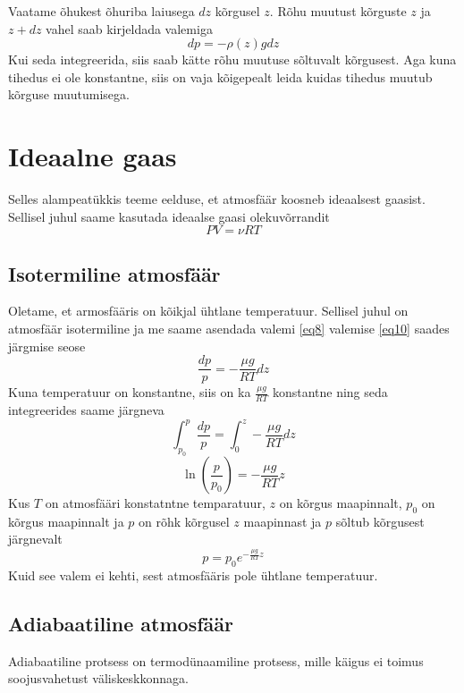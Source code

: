 \documentclass{trkut}%
\begin{document}
Vaatame õhukest õhuriba laiusega $dz$ kõrgusel $z$. Rõhu muutust kõrguste $z$ ja $z + dz$ vahel saab kirjeldada valemiga
\begin{equation}\label{eq10}
dp=-\rho (z) gdz
\end{equation}
Kui seda integreerida, siis saab kätte rõhu muutuse sõltuvalt kõrgusest. Aga kuna tihedus ei ole konstantne, siis on vaja kõigepealt leida kuidas tihedus muutub kõrguse muutumisega.

\section{Ideaalne gaas}
Selles alampeatükkis teeme eelduse, et atmosfäär koosneb ideaalsest gaasist. Sellisel juhul saame kasutada ideaalse gaasi olekuvõrrandit
\begin{equation}\label{eq8}
PV=\nu RT
\end{equation}

\subsection{Isotermiline atmosfäär}
Oletame, et armosfääris on kõikjal ühtlane temperatuur. Sellisel juhul on atmosfäär isotermiline ja me saame asendada valemi \ref{eq8} valemise \ref{eq10} saades järgmise seose
\begin{equation}\label{eq16}
\frac{dp}{p} = -\frac{\mu g}{RT}dz
\end{equation}
Kuna temperatuur on konstantne, siis on ka $\frac{\mu g}{RT}$ konstantne ning seda integreerides saame järgneva
\begin{equation*}
\int_{p_0}^{p} \frac{dp}{p}  = \int_{0}^{z} -\frac{\mu g}{RT}dz
\end{equation*}
\begin{equation*}
\ln(\frac{p}{p_0}) = - \frac{\mu g}{RT} z
\end{equation*}
Kus $T$ on atmosfääri konstatntne temparatuur, $z$ on kõrgus maapinnalt, $p_0$ on kõrgus maapinnalt ja $p$ on rõhk kõrgusel $z$ maapinnast ja $p$ sõltub kõrgusest järgnevalt
\begin{equation*}
p = p_0 e^{-\frac{\mu g}{RT}z}
\end{equation*}
Kuid see valem ei kehti, sest atmosfääris pole ühtlane temperatuur.

          
\subsection{Adiabaatiline atmosfäär}
Adiabaatiline protsess on termodünaamiline protsess, mille käigus ei toimus soojusvahetust väliskeskkonnaga.
\end{document}
